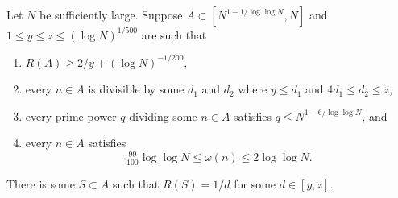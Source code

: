 \begin{proposition}\label{prop:techmain}
\leanok
Let $N$ be sufficiently large. Suppose $A\subset [N^{1-1/\log\log N},N]$ and $1\leq y\leq z\leq (\log N)^{1/500}$ are such that
\begin{enumerate}
\item $R(A)\geq 2/y+(\log N)^{-1/200}$,
\item every $n\in A$ is divisible by some $d_1$ and $d_2$ where $y\leq d_1$ and $4d_1\leq d_2\leq z$,
\item every prime power $q$ dividing some $n\in A$ satisfies $q\leq N^{1-6/\log\log N}$, and
\item every $n\in A$ satisfies
\[\tfrac{99}{100}\log\log N\leq \omega(n) \leq 2\log\log N.\]
\end{enumerate}
There is some $S\subset A$ such that $R(S)=1/d$ for some $d\in [y,z]$.
\end{proposition}
